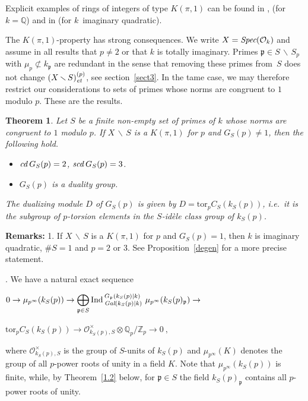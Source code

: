 \documentclass[10pt]{article}
\newcommand{\Spec}{\text{\it Spec}}
\newcommand{\Q}{{\mathbb Q}}
\newcommand{\Z}{{\mathbb Z}}
\renewcommand{\O}{{\mathcal{O}}}
\newcommand{\p}{{\mathfrak p}}
\newcommand{\sm}{{\,\smallsetminus\,}}
\newcommand{\et}{\text{\it et}}
\newcommand{\cd}{\text{\it cd}\:}
\newcommand{\scd}{\text{\it scd}\:}
\newcommand{\Gal}{\text{\it Gal}}
\theoremstyle{alex}
\newtheorem{itheorem}{Theorem}
\theoremstyle{alexdef}
\begin{document}
Explicit examples of rings of integers of type $K(\pi,1)$ can be found in \cite{La}, \cite{S} (for $k=\Q$) and in \cite{Vo} (for $k$~imaginary quadratic).


\medskip
The $K(\pi,1)$-property has strong consequences. We write $X=\Spec(\O_k)$ and assume in all results that $p\neq 2$ or that $k$ is totally imaginary.
Primes $\p\in S\sm S_p$ with $\mu_p\not\subset k_\p$ are redundant in the sense that removing these primes from~$S$ does not change $(X\sm S)_\et^{(p)}$, see section~\ref{sect3}. In the tame case, we may therefore restrict our considerations to sets of primes whose norms are congruent to $1$ modulo $p$. These are the results.


\begin{itheorem} \label{1.1} Let $S$ be a finite non-empty set of primes of\/ $k$ whose norms are congruent to $1$ modulo $p$.  If\/ $X\sm S$ is a $K(\pi,1)$ for $p$ and $G_S(p)\neq 1$, then the following hold.
\begin{itemize}
\item[\rm (i)] $\cd G_S(p)=2$, $\scd G_S(p)=3$.
\item[\rm (ii)] $G_S(p)$ is a duality group.
\end{itemize}
The dualizing module $D$ of $G_S(p)$ is given by
$
D=\text{tor}_p C_S(k_S(p))$, i.e.\ it is the subgroup of $p$-torsion elements in the $S$-id\`{e}le class group of\/ $k_S(p)$.
\end{itheorem}

\noindent
{\bf Remarks:} 1. If $X\sm S$ is a $K(\pi,1)$ for $p$ and $G_S(p)= 1$, then  $k$ is imaginary qua\-dratic, $\#S=1$ and $p=2$ or $3$. See Proposition~\ref{degen} for a more precise statement.

\smallskip{}. We have a natural exact sequence

\bigskip
$\displaystyle 0 \to \mu_{p^\infty}(k_S(p)) \to \bigoplus_{{\mathfrak p} \in S} \text{\rm Ind\,}^{G_{\mathfrak p}(k_S(p)|k)}_{\Gal(k_S(p)|k)}\ \mu_{p^\infty}(k_S(p)_\p) \to
$
\begin{flushright}
$\text{tor}_p C_S(k_S(p)) \to {\mathcal O}_{k_S(p), S}^\times \otimes \Q_p/\Z_p \to 0\ ,\quad $
\end{flushright}
where ${\mathcal O}_{k_S(p), S}^\times$ is the group of $S$-units of\/ $k_S(p)$ and $\mu_{p^\infty}(K)$ denotes the group of all $p$-power roots of unity in a field $K$. Note that $\mu_{p^\infty}(k_S(p))$ is finite, while, by Theorem~\ref{1.2} below,  for $\p\in S$ the field $k_S(p)_\p$ contains all $p$-power roots of unity.
\end{document}
